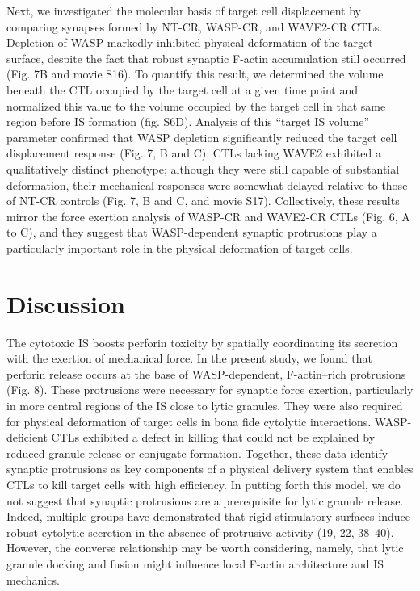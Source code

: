 Next, we investigated the molecular basis of target cell displacement by comparing synapses formed by NT-CR, WASP-CR, and WAVE2-CR CTLs. Depletion of WASP markedly inhibited physical deformation of the target surface, despite the fact that robust synaptic F-actin accumulation still occurred (Fig. 7B and movie S16). To quantify this result, we determined the volume beneath the CTL occupied by the target cell at a given time point and normalized this value to the volume occupied by the target cell in that same region before IS formation (fig. S6D). Analysis of this “target IS volume” parameter confirmed that WASP depletion significantly reduced the target cell displacement response (Fig. 7, B and C). CTLs lacking WAVE2 exhibited a qualitatively distinct phenotype; although they were still capable of substantial deformation, their mechanical responses were somewhat delayed relative to those of NT-CR controls (Fig. 7, B and C, and movie S17). Collectively, these results mirror the force exertion analysis of WASP-CR and WAVE2-CR CTLs (Fig. 6, A to C), and they suggest that WASP-dependent synaptic protrusions play a particularly important role in the physical deformation of target cells.

\section{Discussion}
The cytotoxic IS boosts perforin toxicity by spatially coordinating its secretion with the exertion of mechanical force. In the present study, we found that perforin release occurs at the base of WASP-dependent, F-actin–rich protrusions (Fig. 8). These protrusions were necessary for synaptic force exertion, particularly in more central regions of the IS close to lytic granules. They were also required for physical deformation of target cells in bona fide cytolytic interactions. WASP-deficient CTLs exhibited a defect in killing that could not be explained by reduced granule release or conjugate formation. Together, these data identify synaptic protrusions as key components of a physical delivery system that enables CTLs to kill target cells with high efficiency. In putting forth this model, we do not suggest that synaptic protrusions are a prerequisite for lytic granule release. Indeed, multiple groups have demonstrated that rigid stimulatory surfaces induce robust cytolytic secretion in the absence of protrusive activity (19, 22, 38–40). However, the converse relationship may be worth considering, namely, that lytic granule docking and fusion might influence local F-actin architecture and IS mechanics.

